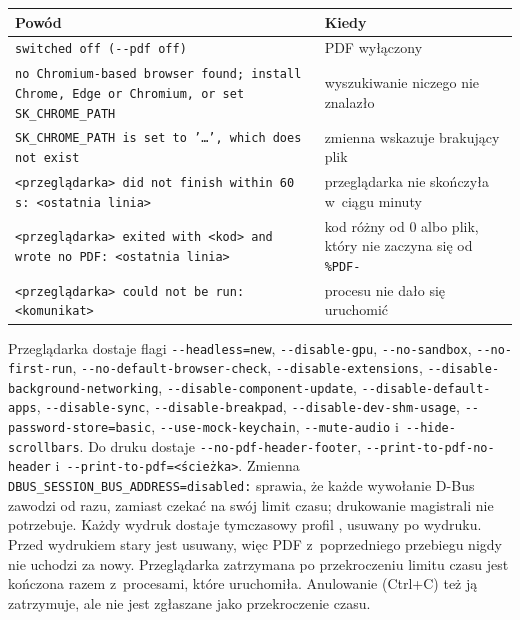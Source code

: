 {\small
\begin{tabularx}{\linewidth}{@{}>{\raggedright\arraybackslash}p{7.2cm} >{\raggedright\arraybackslash}X@{}}
\toprule
Powód & Kiedy \\
\midrule
\texttt{switched off (-{}-pdf off)} & PDF wyłączony \\
\texttt{no Chromium-based browser found; install Chrome, Edge or Chromium, or set
SK\_CHROME\_PATH} & wyszukiwanie niczego nie znalazło \\
\texttt{SK\_CHROME\_PATH is set to '…', which does not exist} & zmienna wskazuje brakujący
plik \\
\texttt{<przeglądarka> did not finish within 60 s: <ostatnia linia>} & przeglądarka nie
skończyła w~ciągu minuty \\
\texttt{<przeglądarka> exited with <kod> and wrote no PDF: <ostatnia linia>} & kod różny od
0 albo plik, który nie zaczyna się od \texttt{\%PDF-} \\
\texttt{<przeglądarka> could not be run: <komunikat>} & procesu nie dało się uruchomić \\
\bottomrule
\end{tabularx}
}

Przeglądarka dostaje flagi \texttt{-{}-headless=new}, \texttt{-{}-disable-gpu},
\texttt{-{}-no-sandbox}, \texttt{-{}-no-first-run}, \texttt{-{}-no-default-browser-check},
\texttt{-{}-disable-extensions}, \texttt{-{}-disable-background-networking},
\texttt{-{}-disable-component-update}, \texttt{-{}-disable-default-apps},
\texttt{-{}-disable-sync}, \texttt{-{}-disable-breakpad}, \texttt{-{}-disable-dev-shm-usage},
\texttt{-{}-password-store=basic}, \texttt{-{}-use-mock-keychain}, \texttt{-{}-mute-audio}
i~\texttt{-{}-hide-scrollbars}. Do druku dostaje \texttt{-{}-no-pdf-header-footer},
\texttt{-{}-print-to-pdf-no-header} i~\texttt{-{}-print-to-pdf=<ścieżka>}. Zmienna
\texttt{DBUS\_SESSION\_BUS\_ADDRESS=disabled:} sprawia, że każde wywołanie D-Bus zawodzi od
razu, zamiast czekać na swój limit czasu; drukowanie magistrali nie potrzebuje. Każdy wydruk
dostaje tymczasowy profil , usuwany po wydruku. Przed wydrukiem stary
 jest usuwany, więc PDF z~poprzedniego przebiegu nigdy nie uchodzi za
nowy. Przeglądarka zatrzymana po przekroczeniu limitu czasu jest kończona razem
z~procesami, które uruchomiła. Anulowanie (Ctrl+C) też ją zatrzymuje, ale nie jest
zgłaszane jako przekroczenie czasu.


